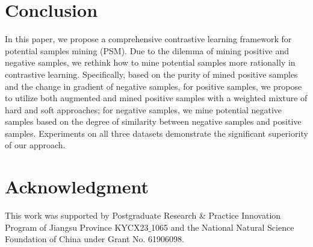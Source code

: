 \documentclass[review]{elsarticle}
\begin{document}
\section{Conclusion}
In this paper, we propose a comprehensive contrastive  learning framework for potential samples mining (PSM). Due to the dilemma of mining positive and negative samples, we rethink how to mine potential samples more rationally in contrastive learning. Specifically, based on the purity of mined positive samples and the change in gradient of negative samples, for positive samples, we propose to utilize both augmented and mined positive samples with a weighted mixture of hard and soft approaches; for negative samples, we mine potential negative samples based on the degree of similarity between negative samples and positive samples. Experiments on all three datasets demonstrate the significant superiority of our approach.

\section*{Acknowledgment}

This work was supported by Postgraduate Research \& Practice Innovation Program of Jiangsu Province KYCX23$\_$1065 and the National Natural Science Foundation of China under Grant No. 61906098.


\end{document}
